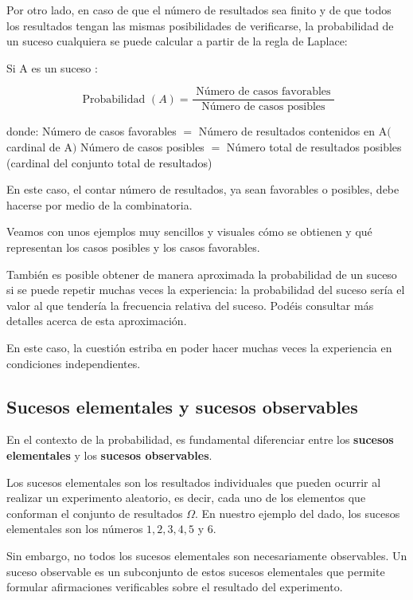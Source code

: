 \documentclass[
]{article}
\begin{document}
Por otro lado, en caso de que el número de resultados sea finito y de
que todos los resultados tengan las mismas posibilidades de verificarse,
la probabilidad de un suceso cualquiera se puede calcular a partir de la
regla de Laplace:

Si A es un suceso :

\[
\text { Probabilidad }(A)=\frac{\text { Número de casos favorables }}{\text { Número de casos posibles }}
\]

donde: Número de casos favorables \(=\) Número de resultados contenidos en
\(\mathrm{A}(\) cardinal de A\()\) Número de casos posibles \(=\) Número total
de resultados posibles (cardinal del conjunto total de resultados)

En este caso, el contar número de resultados, ya sean favorables o
posibles, debe hacerse por medio de la combinatoria.

Veamos con unos ejemplos muy sencillos y visuales cómo se obtienen y qué
representan los casos posibles y los casos favorables.

También es posible obtener de manera aproximada la probabilidad de un
suceso si se puede repetir muchas veces la experiencia: la probabilidad
del suceso sería el valor al que tendería la frecuencia relativa del
suceso. Podéis consultar más detalles acerca de esta aproximación.

En este caso, la cuestión estriba en poder hacer muchas veces la
experiencia en condiciones independientes.

\subsection{Sucesos elementales y sucesos observables}\label{sucesos-elementales-y-sucesos-observables}

En el contexto de la probabilidad, es fundamental diferenciar entre los \textbf{sucesos elementales} y los \textbf{sucesos observables}.

Los sucesos elementales son los resultados individuales que pueden ocurrir al realizar un experimento aleatorio, es decir, cada uno de los elementos que conforman el conjunto de resultados \(\Omega\). En nuestro ejemplo del dado, los sucesos elementales son los números \(1, 2, 3, 4, 5\) y \(6\).

Sin embargo, no todos los sucesos elementales son necesariamente observables. Un suceso observable es un subconjunto de estos sucesos elementales que permite formular afirmaciones verificables sobre el resultado del experimento.
\end{document}

